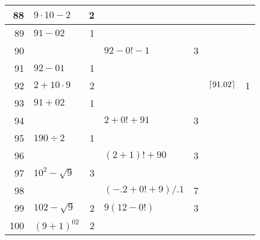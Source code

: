 \begin{longtable}{r l r l r l r}
88 & $9\cdot 10-2$ & 2 \\ \midrule
89 & $91-02$ & 1 \\ \midrule
\midrule
90 & & & $92-0!-1$ & 3 \\ \midrule
91 & $92-01$ & 1 \\ \midrule
92 & $2+10 \cdot 9$ & 2 & & & $\lceil91.02\rceil$ & 1 \\ \midrule
93 & $91+02$ & 1 \\ \midrule
94 & & & $2+0!+91$ & 3 \\ \midrule
95 & $190\div2$ & 1 \\ \midrule
96 & & & $(2+1)! + 90$ & 3\\ \midrule
97 & $10^2 - \sqrt{9}$ & 3 \\ \midrule
98 & & & $(-.2+0!+9)/.1$ & 7\\ \midrule
99 & $102-\sqrt{9}$ & 2 & $9(12-0!)$ & 3 \\ \midrule
\midrule
100 & ${(9+1)}^{02}$ & 2 \\ \bottomrule
\end{longtable}